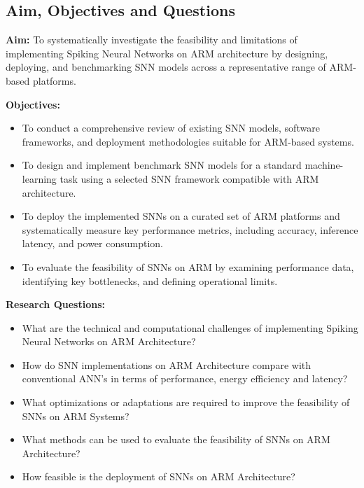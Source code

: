 \documentclass[a4paper,12pt]{article}
\begin{document}
	\subsection{Aim, Objectives and Questions}
	\textbf{Aim:} To systematically investigate the feasibility and limitations of implementing Spiking Neural Networks on ARM architecture by designing, deploying, and benchmarking SNN models across a representative range of ARM-based platforms.
	
	\textbf{Objectives:}
	\begin{itemize}
		\item To conduct a comprehensive review of existing SNN models, software frameworks, and deployment methodologies suitable for ARM-based systems.
		\item To design and implement benchmark SNN models for a standard machine-learning task using a selected SNN framework compatible with ARM architecture.
		\item To deploy the implemented SNNs on a curated set of ARM platforms and systematically measure key performance metrics, including accuracy, inference latency, and power consumption.
		\item To evaluate the feasibility of SNNs on ARM by examining performance data, identifying key bottlenecks, and defining operational limits.
	\end{itemize}
	
	\textbf{Research Questions:}
	\begin{itemize}
		\item What are the technical and computational challenges of implementing Spiking Neural Networks on ARM Architecture?
		\item How do SNN implementations on ARM Architecture compare with conventional ANN's in terms of performance, energy efficiency and latency?
		\item What optimizations or adaptations are required to improve the feasibility of SNNs on ARM Systems?
		\item What methods can be used to evaluate the feasibility of SNNs on ARM Architecture?
		\item How feasible is the deployment of SNNs on ARM Architecture?
	\end{itemize}
	
\end{document}
